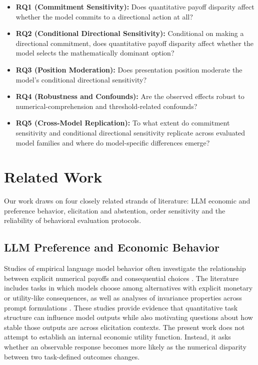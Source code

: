 \documentclass[10pt,journal,compsoc]{IEEEtran}
\begin{document}
\begin{itemize}
    \item \textbf{RQ1 (Commitment Sensitivity):} Does quantitative payoff disparity affect whether the model commits to a directional action at all?
    \item \textbf{RQ2 (Conditional Directional Sensitivity):} Conditional on making a directional commitment, does quantitative payoff disparity affect whether the model selects the mathematically dominant option?
    \item \textbf{RQ3 (Position Moderation):} Does presentation position moderate the model's conditional directional sensitivity?
    \item \textbf{RQ4 (Robustness and Confounds):} Are the observed effects robust to numerical-comprehension and threshold-related confounds?
    \item \textbf{RQ5 (Cross-Model Replication):} To what extent do commitment sensitivity and conditional directional sensitivity replicate across evaluated model families and where do model-specific differences emerge?
\end{itemize}

\section{Related Work}
\label{sec:related_work}

Our work draws on four closely related strands of literature: LLM economic and preference behavior, elicitation and abstention, order sensitivity and the reliability of behavioral evaluation protocols.

\subsection{LLM Preference and Economic Behavior}
Studies of empirical language model behavior often investigate the relationship between explicit numerical payoffs and consequential choices \cite{what_do_llms_want_2026,probing_preferences_2025}. The literature includes tasks in which models choose among alternatives with explicit monetary or utility-like consequences, as well as analyses of invariance properties across prompt formulations \cite{innate_econ_preferences_2026,what_do_llms_want_2026}. These studies provide evidence that quantitative task structure can influence model outputs while also motivating questions about how stable those outputs are across elicitation contexts. The present work does not attempt to establish an internal economic utility function. Instead, it asks whether an observable response becomes more likely as the numerical disparity between two task-defined outcomes changes.
\end{document}
